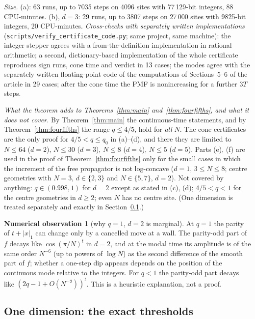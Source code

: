\documentclass[11pt,a4paper]{article}
\theoremstyle{definition}
\newtheorem{observation}[theorem]{Numerical observation}
\begin{document}
\emph{Size.} (a): 63 runs, up to 7035 steps on 4096 sites with 77\,129-bit integers, 88 CPU-minutes. (b), $d=3$: 29 runs, up to 3807 steps on 27\,000 sites with 9825-bit integers, 20 CPU-minutes. \emph{Cross-checks with separately written implementations} (\texttt{scripts/verify\_certificate\_code.py}; same project, same machine): the integer stepper agrees with a from-the-definition implementation in rational arithmetic; a second, dictionary-based implementation of the whole certificate reproduces sign runs, cone time and verdict in 13 cases; the modes agree with the separately written floating-point code of the computations of Sections~5--6 of the article in 29 cases; after the cone time the PMF is nonincreasing for a further $3T$ steps.

\emph{What the theorem adds to Theorems~\ref{thm:main} and~\ref{thm:fourfifths}, and what it does not cover.} By Theorem~\ref{thm:main} the continuous-time statements, and by Theorem~\ref{thm:fourfifths} the range $q\le4/5$, hold for \emph{all} $N$. The cone certificates are the only proof for $4/5<q\le q_0$ in (a)--(d), and there they are limited to $N\le64$ ($d=2$), $N\le30$ ($d=3$), $N\le8$ ($d=4$), $N\le5$ ($d=5$). Parts (e), (f) are used in the proof of Theorem~\ref{thm:fourfifths} only for the small cases in which the increment of the free propagator is not log-concave ($d=1$, $3\le N\le8$; centre geometries with $N=3$, $d\in\{2,3\}$ and $N\in\{5,7\}$, $d=2$). Not covered by anything: $q\in(0.998,1)$ for $d=2$ except as stated in (c), (d); $4/5<q<1$ for the centre geometries in $d\ge2$; even $N$ has no centre site. (One dimension is treated separately and exactly in Section~\ref{sec:thr1d}.)

\begin{observation}[why $q=1$, $d=2$ is marginal]\label{obs:parity}
At $q=1$ the parity of $t+|x|_1$ can change only by a cancelled move at a wall. The parity-odd part of $f$ decays like $\cos(\pi/N)^t$ in $d=2$, and at the modal time its amplitude is of the same order $N^{-6}$ (up to powers of $\log N$) as the second difference of the smooth part of $f$; whether a one-step dip appears depends on the position of the continuous mode relative to the integers. For $q<1$ the parity-odd part decays like $(2q-1+O(N^{-2}))^t$. This is a heuristic explanation, not a proof.
\end{observation}

\subsection{One dimension: the exact thresholds}\label{sec:thr1d}
\end{document}
